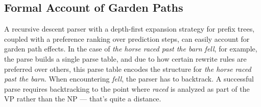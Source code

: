 \subsection{Formal Account of Garden Paths}
\label{sub:TopDownEval_FormalGardenPath}
A recursive descent parser with a depth-first expansion strategy for prefix trees, coupled with a preference ranking over prediction steps, can easily account for garden path effects.
In the case of \emph{the horse raced past the barn fell}, for example, the parse builds a single parse table, and due to how certain rewrite rules are preferred over others, this parse table encodes the structure for \emph{the horse raced past the barn}.
When encountering \emph{fell}, the parser has to backtrack.
A successful parse requires backtracking to the point where \emph{raced} is analyzed as part of the VP rather than the NP --- that's quite a distance.
%
